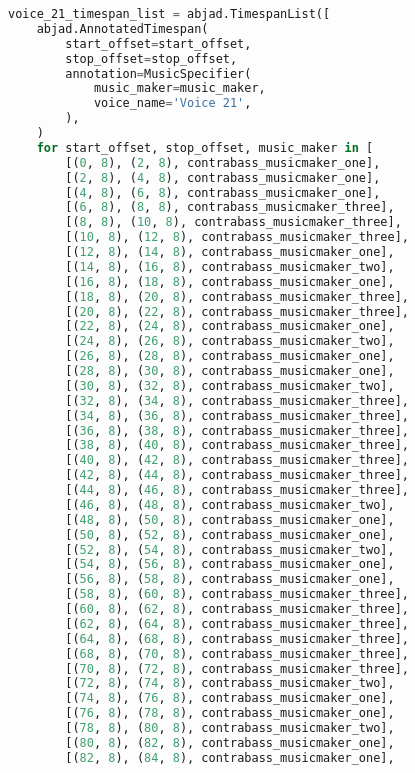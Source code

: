\begin{lstlisting}[language=Python, caption=Invocation Source Code]
voice_21_timespan_list = abjad.TimespanList([
    abjad.AnnotatedTimespan(
        start_offset=start_offset,
        stop_offset=stop_offset,
        annotation=MusicSpecifier(
            music_maker=music_maker,
            voice_name='Voice 21',
        ),
    )
    for start_offset, stop_offset, music_maker in [
        [(0, 8), (2, 8), contrabass_musicmaker_one],
        [(2, 8), (4, 8), contrabass_musicmaker_one],
        [(4, 8), (6, 8), contrabass_musicmaker_one],
        [(6, 8), (8, 8), contrabass_musicmaker_three],
        [(8, 8), (10, 8), contrabass_musicmaker_three],
        [(10, 8), (12, 8), contrabass_musicmaker_three],
        [(12, 8), (14, 8), contrabass_musicmaker_one],
        [(14, 8), (16, 8), contrabass_musicmaker_two],
        [(16, 8), (18, 8), contrabass_musicmaker_one],
        [(18, 8), (20, 8), contrabass_musicmaker_three],
        [(20, 8), (22, 8), contrabass_musicmaker_three],
        [(22, 8), (24, 8), contrabass_musicmaker_one],
        [(24, 8), (26, 8), contrabass_musicmaker_two],
        [(26, 8), (28, 8), contrabass_musicmaker_one],
        [(28, 8), (30, 8), contrabass_musicmaker_one],
        [(30, 8), (32, 8), contrabass_musicmaker_two],
        [(32, 8), (34, 8), contrabass_musicmaker_three],
        [(34, 8), (36, 8), contrabass_musicmaker_three],
        [(36, 8), (38, 8), contrabass_musicmaker_three],
        [(38, 8), (40, 8), contrabass_musicmaker_three],
        [(40, 8), (42, 8), contrabass_musicmaker_three],
        [(42, 8), (44, 8), contrabass_musicmaker_three],
        [(44, 8), (46, 8), contrabass_musicmaker_three],
        [(46, 8), (48, 8), contrabass_musicmaker_two],
        [(48, 8), (50, 8), contrabass_musicmaker_one],
        [(50, 8), (52, 8), contrabass_musicmaker_one],
        [(52, 8), (54, 8), contrabass_musicmaker_two],
        [(54, 8), (56, 8), contrabass_musicmaker_one],
        [(56, 8), (58, 8), contrabass_musicmaker_one],
        [(58, 8), (60, 8), contrabass_musicmaker_three],
        [(60, 8), (62, 8), contrabass_musicmaker_three],
        [(62, 8), (64, 8), contrabass_musicmaker_three],
        [(64, 8), (68, 8), contrabass_musicmaker_three],
        [(68, 8), (70, 8), contrabass_musicmaker_three],
        [(70, 8), (72, 8), contrabass_musicmaker_three],
        [(72, 8), (74, 8), contrabass_musicmaker_two],
        [(74, 8), (76, 8), contrabass_musicmaker_one],
        [(76, 8), (78, 8), contrabass_musicmaker_one],
        [(78, 8), (80, 8), contrabass_musicmaker_two],
        [(80, 8), (82, 8), contrabass_musicmaker_one],
        [(82, 8), (84, 8), contrabass_musicmaker_one],

\end{lstlisting}
